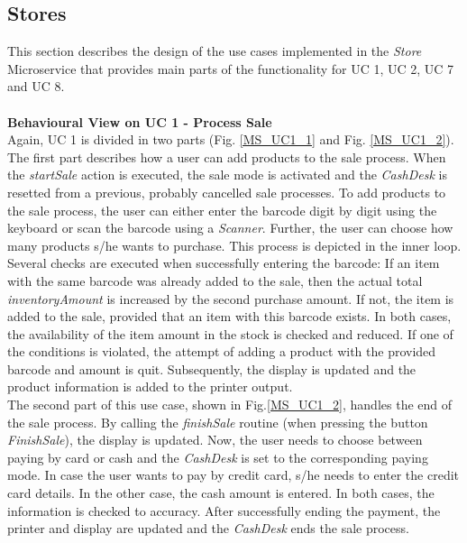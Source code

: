 		\FloatBarrier
			
		\subsection{Stores}
			This section describes the design of the use cases implemented in the \textit{Store} Microservice that provides main parts of the functionality for UC 1, UC 2, UC 7 and UC 8.\\
	
		\noindent
		\\
		\textbf{Behavioural View on UC 1 - Process Sale} \\
		Again, UC 1 is divided in two parts (Fig. \ref{MS_UC1_1} and Fig. \ref{MS_UC1_2}).
		The first part describes how a user can add products to the sale process. When the \textit{startSale} action is executed, the sale mode is activated and the \textit{CashDesk} is resetted from a previous, probably cancelled sale processes. To add products to the sale process, the user can either enter the barcode digit by digit using the keyboard or scan the barcode using a \textit{Scanner}. Further, the user can choose how many products s/he wants to purchase. This process is depicted in the inner loop. 
		\\
		Several checks are executed when successfully entering the barcode: If an item with the same barcode was already added to the sale, then the actual total \textit{inventoryAmount}  is increased by the second purchase amount. If not, the item is added to the sale, provided that an item with this barcode exists. In both cases, the availability of the item amount in the stock is checked and reduced. If one of the conditions is violated, the attempt of adding a product with the provided barcode and amount is quit. 
		Subsequently, the display is updated and the product information is added to the printer output.
		\\
		The second part of this use case, shown in Fig.\ref{MS_UC1_2}, handles the end of the sale process. By calling the \textit{finishSale} routine (when pressing the button \textit{FinishSale}), the display is updated. Now, the user needs to choose between paying by card or cash and the \textit{CashDesk} is set to the corresponding paying mode. In case the user wants to pay by credit card, s/he needs to enter the credit card details. In the other case, the cash amount is entered. In both cases, the information is checked to accuracy.
		After successfully ending the payment, the printer and display are updated and the \textit{CashDesk} ends the sale process.

